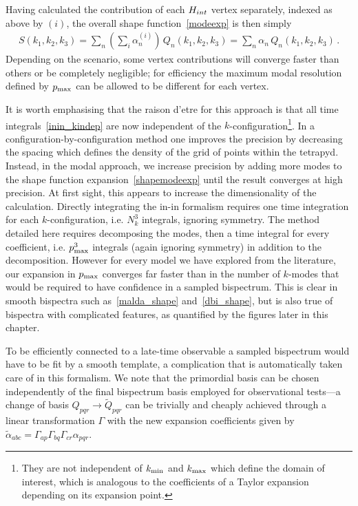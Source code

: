 Having calculated the contribution of each $H_{int}$ vertex separately,
indexed as above by $(i)$, the overall shape function~\eqref{modeexp} is then simply
\begin{align}\label{shapemodeexp}
    S(k_1, k_2,k_3) =   \sum_n \left(\sum_i \alpha_n^{(i)}\right) \, Q_n(k_1,k_2,k_3) =  \sum_n \alpha_n \, Q_n(k_1,k_2,k_3) \,.
\end{align}
Depending on the scenario,  some vertex contributions will converge faster than others 
or be completely negligible;
for efficiency the maximum modal resolution defined by $p_\text{max}$ can be allowed to be different
for each vertex.  
 

It is worth emphasising that the raison d'etre for this approach is that all time integrals~\eqref{inin_kindep} are now independent of the $k$-configuration\footnote{
    They are not independent of ${k_\text{min}}$ and ${k_\text{max}}$ which define the domain of interest,
    which is analogous to the coefficients of a Taylor expansion depending on its expansion point.
}.
In a configuration-by-configuration method one improves the precision by
decreasing the spacing which defines the density of the grid of points within the tetrapyd.
Instead, in the modal approach, we increase precision by adding more modes to the shape function expansion~\eqref{shapemodeexp}
until the result converges at high precision.   At first sight, this appears to increase the dimensionality of the calculation.
Directly integrating the in-in formalism requires one time
integration for each $k$-configuration, i.e. $N_k^3$ integrals, ignoring symmetry.
The method detailed here requires decomposing the modes,
then a time integral for every coefficient, i.e. $p_\text{max}^3$ integrals
(again ignoring symmetry) in addition to the decomposition.
However for every model we have explored from the literature,
our expansion in $p_\text{max}$ converges far faster than in the number of
$k$-modes that would be required to have confidence in a sampled bispectrum.
This is clear in smooth bispectra such as~\eqref{malda_shape} and~\eqref{dbi_shape},
but is also true of bispectra with complicated features,
as quantified by the figures later in this chapter.


To be efficiently connected to a late-time observable
a sampled bispectrum would have to be fit by a smooth template,
a complication that is automatically taken care of in this formalism.
We note that the primordial basis can be chosen
independently of the final bispectrum basis employed for observational tests---a change of
basis $Q_{pqr}\rightarrow \tilde Q_{pqr}$ can be trivially
and cheaply achieved through a linear transformation $\Gamma$
with the new expansion coefficients given by $\tilde \alpha_{abc} = \Gamma_{ap}\Gamma_{bq}\Gamma_{cr}\alpha_{pqr}$. 


